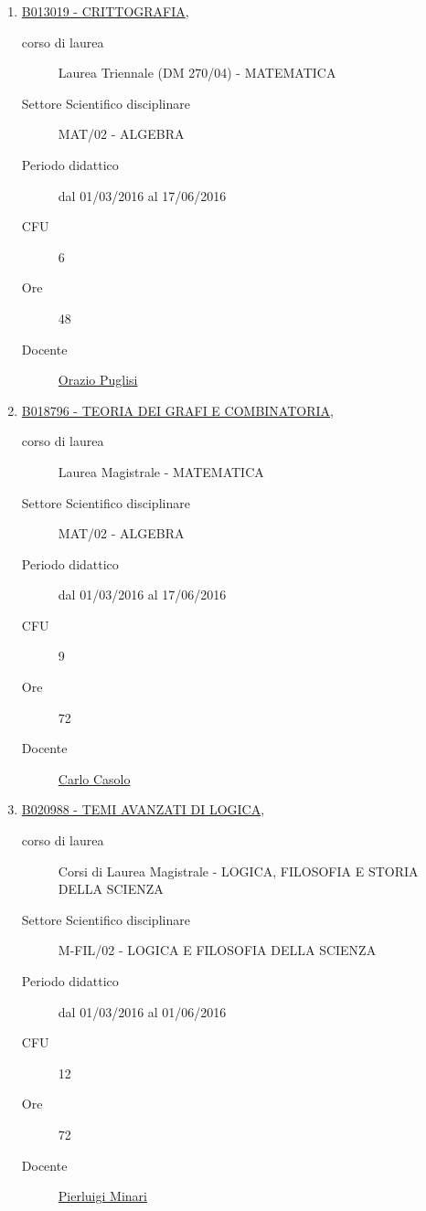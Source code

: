 \documentclass[11pt]{article}
\begin{document}
\begin{enumerate}

\item \href{http://www.unifi.it/index.php?module=ofform2&mode=1&cmd=3&AA=2015&afId=359747}{B013019 - CRITTOGRAFIA},
    \begin{description}
        \item[corso di laurea] Laurea Triennale (DM 270/04) - MATEMATICA
        \item[Settore Scientifico disciplinare] MAT/02 - ALGEBRA
        \item[Periodo didattico] dal 01/03/2016 al 17/06/2016
        \item[CFU] 6
        \item[Ore] 48
        \item[Docente] \href{http://www.unifi.it/p-doc2-2015-0-A-2b333c2b3228-0.html}{Orazio Puglisi}

    \end{description}

\item \href{http://www.unifi.it/index.php?module=ofform2&mode=1&cmd=3&AA=2015&afId=426613}{B018796 - TEORIA DEI GRAFI E COMBINATORIA},
    \begin{description}
        \item[corso di laurea] Laurea Magistrale - MATEMATICA
        \item[Settore Scientifico disciplinare] MAT/02 - ALGEBRA
        \item[Periodo didattico] dal 01/03/2016 al 17/06/2016
        \item[CFU] 9
        \item[Ore] 72
        \item[Docente] \href{http://www.unifi.it/p-doc2-2015-0-A-2b333a29342e-0.html}{Carlo Casolo}

    \end{description}

\item \href{http://www.unifi.it/index.php?module=ofform2&mode=1&cmd=3&AA=2015&afId=427440}{B020988 - TEMI AVANZATI DI LOGICA},
    \begin{description}
        \item[corso di laurea] Corsi di Laurea Magistrale - LOGICA, FILOSOFIA E STORIA DELLA SCIENZA
        \item[Settore Scientifico disciplinare] M-FIL/02 - LOGICA E FILOSOFIA DELLA SCIENZA
        \item[Periodo didattico] dal 01/03/2016 al 01/06/2016
        \item[CFU] 12 
        \item[Ore] 72
        \item[Docente] \href{http://www.unifi.it/p-doc2-2015-0-A-2b333b2c362a-0.html}{Pierluigi Minari}


\end{description}
\end{enumerate}
\end{document}
